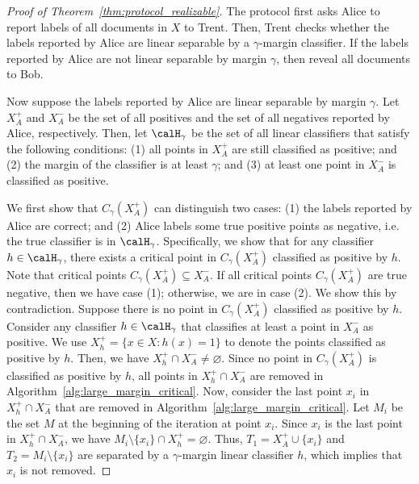 \begin{proof}[Proof of Theorem~\ref{thm:protocol_realizable}]
    The protocol first asks Alice to report labels of all documents in $X$ to Trent. Then, Trent checks whether the labels reported by Alice are linear separable by a $\gamma$-margin classifier. If the labels reported by Alice are not linear separable by margin $\gamma$, then reveal all documents to Bob. 
    
    Now suppose the labels reported by Alice are linear separable by margin $\gamma$. Let $X_A^+$ and $X_A^-$ be the set of all positives and the set of all negatives reported by Alice, respectively. Then, let $\calH_\gamma$ be the set of all linear classifiers that satisfy the following conditions: (1) all points in $X_A^+$ are still classified as positive; and (2) the margin of the classifier is at least $\gamma$; and (3) at least one point in $X_A^-$ is classified as positive. 
    
    We first show that $C_\gamma(X_A^+)$ can distinguish two cases: (1) the labels reported by Alice are correct; and (2) Alice labels some true positive points as negative, i.e. the true classifier is in $\calH_\gamma$. 
    Specifically, we show that for any classifier $h \in \calH_\gamma$, there exists a critical point in $C_\gamma(X_A^+)$ classified as positive by $h$. 
    Note that critical points $C_\gamma(X_A^+) \subseteq X_A^-$. 
    If all critical points $C_\gamma(X_A^+)$ are true negative, then we have case (1); otherwise, we are in case (2).
    We show this by contradiction. Suppose there is no point in $C_\gamma(X_A^+)$ classified as positive by $h$. 
    Consider any classifier $h \in \calH_\gamma$ that classifies at least a point in $X_A^-$ as positive. We use $X_h^+ = \{x \in X: h(x) = 1\}$ to denote the points classified as positive by $h$. Then, we have $X_h^+ \cap X_A^- \neq \varnothing$. Since no point in $C_\gamma(X_A^+)$ is classified as positive by $h$, all points in $X_h^+ \cap X_A^-$ are removed in Algorithm~\ref{alg:large_margin_critical}. Now, consider the last point $x_i$ in $X_h^+ \cap X_A^-$ that are removed in Algorithm~\ref{alg:large_margin_critical}. Let $M_i$ be the set $M$ at the beginning of the iteration at point $x_i$. Since $x_i$ is the last point in $X_h^+ \cap X_A^-$, we have $M_i \setminus \{x_i\} \cap X_h^+ = \varnothing$. Thus, $T_1 = X_A^+ \cup \{x_i\}$ and $T_2 = M_i \setminus \{x_i\}$ are separated by a $\gamma$-margin linear classifier $h$, which implies that $x_i$ is not removed. 


\end{proof}
